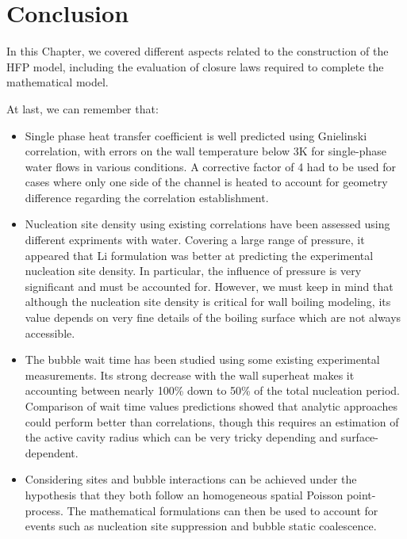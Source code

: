 \section{Conclusion}

In this Chapter, we covered different aspects related to the construction of the HFP model, including the evaluation of closure laws required to complete the mathematical model.

\npar

At last, we can remember that:

\begin{itemize}
\item Single phase heat transfer coefficient is well predicted using Gnielinski correlation, with errors on the wall temperature below 3K for single-phase water flows in various conditions. A corrective factor of 4 had to be used for cases where only one side of the channel is heated to account for geometry difference regarding the correlation establishment.

\item Nucleation site density using existing correlations have been assessed using different expriments with water. Covering a large range of pressure, it appeared that Li \etal \cite{li_development_2018} formulation was better at predicting the experimental nucleation site density. In particular, the influence of pressure is very significant and must be accounted for. However, we must keep in mind that although the nucleation site density is critical for wall boiling modeling, its value depends on very fine details of the boiling surface which are not always accessible.

\item The bubble wait time has been studied using some existing experimental measurements. Its strong decrease with the wall superheat makes it accounting between nearly 100\% down to 50\% of the total nucleation period. Comparison of wait time values predictions showed that analytic approaches could perform better than correlations, though this requires an estimation of the active cavity radius which can be very tricky depending and surface-dependent.

\item Considering sites and bubble interactions can be achieved under the hypothesis that they both follow an homogeneous spatial Poisson point-process. The mathematical formulations can then be used to account for events such as nucleation site suppression and bubble static coalescence.


\end{itemize}
